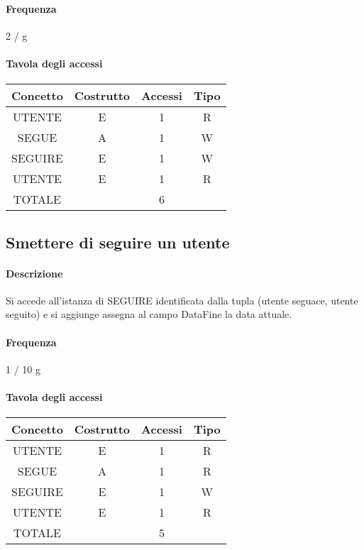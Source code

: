 \documentclass[a4paper,12pt]{report}
\begin{document}
\paragraph{Frequenza} 2 / g
\begin{table}[H]
\paragraph{Tavola degli accessi\newline}
\begin{tabular}{|c|c|c|c|}
\hline
Concetto & Costrutto & Accessi & Tipo \\ \hline
UTENTE   & E         & 1       & R    \\ \hline
SEGUE    & A         & 1       & W    \\ \hline
SEGUIRE  & E         & 1       & W    \\ \hline
UTENTE   & E         & 1       & R    \\ \hline
TOTALE   &           & 6       &      \\ \hline
\end{tabular}
\end{table}
\subsection{Smettere di seguire un utente} \label{unfollow}
\paragraph{Descrizione} Si accede all'istanza di SEGUIRE identificata dalla tupla (utente seguace, utente seguito) e si aggiunge assegna al campo DataFine la data attuale.
\paragraph{Frequenza} 1 / 10 g
\begin{table}[H]
\paragraph{Tavola degli accessi\newline}
\begin{tabular}{|c|c|c|c|}
\hline
Concetto & Costrutto & Accessi & Tipo \\ \hline
UTENTE   & E         & 1       & R    \\ \hline
SEGUE    & A         & 1       & R    \\ \hline
SEGUIRE  & E         & 1       & W    \\ \hline
UTENTE   & E         & 1       & R    \\ \hline
TOTALE   &           & 5       &      \\ \hline
\end{tabular}
\end{table}
\end{document}

